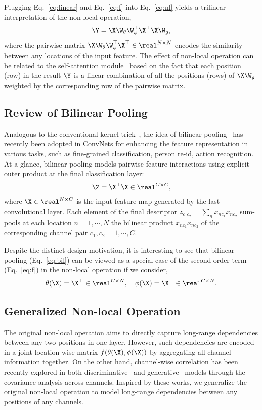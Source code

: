 \documentclass{article}
\begin{document}
Plugging Eq.~\ref{eq:linear} and Eq.~\ref{eq:f} into Eq.~\ref{eq:nl} yields a trilinear interpretation of the non-local operation,
\begin{align}
  \label{eq:tri}
  \Y = \X \W_\theta \W_\phi^\top \X^\top \X \W_g,
\end{align}
where the pairwise matrix $\X \W_\theta \W_\phi^\top \X^\top \in \real^{N \times N}$ encodes the similarity between any locations of the input feature.
The effect of non-local operation can be related to the self-attention module~\cite{VaswaniSPUJGKP17} based on the fact that each position (row) in the result $\Y$ is a linear combination of all the positions (rows) of $\X \W_g$ weighted by the corresponding row of the pairwise matrix.
\subsection{Review of Bilinear Pooling}
Analogous to the conventional kernel trick~\cite{scholkopf2001learning}, the idea of bilinear pooling~\cite{bilinear} has recently been adopted in ConvNets for enhancing the feature representation in various tasks, such as fine-grained classification, person re-id, action recognition.
At a glance, bilinear pooling models pairwise feature interactions using explicit outer product at the final classification layer:
\begin{align}
  \label{eq:bil}
  \Z = \X^\top \X \in \real^{C \times C},
\end{align}
where $\X \in \real^{N \times C}$ is the input feature map generated by the last convolutional layer.
Each element of the final descriptor $z_{c_1 c_2} = \sum_n x_{n c_1} x_{n c_2}$ sum-pools at each location $n = 1, \cdots, N$ the bilinear product $x_{n c_1} x_{n c_2}$ of the corresponding channel pair $c_1, c_2 = 1, \cdots, C$.

Despite the distinct design motivation, it is interesting to see that bilinear pooling (Eq.~\ref{eq:bil}) can be viewed as a special case of the second-order term (Eq.~\ref{eq:f}) in the non-local operation if we consider,
\begin{align}
  \theta(\X) = \X^\top \in \real^{C \times N}, \quad \phi(\X) = \X^{\top} \in \real^{C \times N}.
\end{align}
\subsection{Generalized Non-local Operation}
The original non-local operation aims to directly capture long-range dependencies between any two positions in one layer.
However, such dependencies are encoded in a joint location-wise matrix $f(\theta(\X), \phi(\X))$ by aggregating all channel information together.
On the other hand, channel-wise correlation has been recently explored in both discriminative~\cite{bilinear} and generative~\cite{Ustyuzhaninov2017WhatDI} models through the covariance analysis across channels.
Inspired by these works, we generalize the original non-local operation to model long-range dependencies between any positions of any channels.
\end{document}
